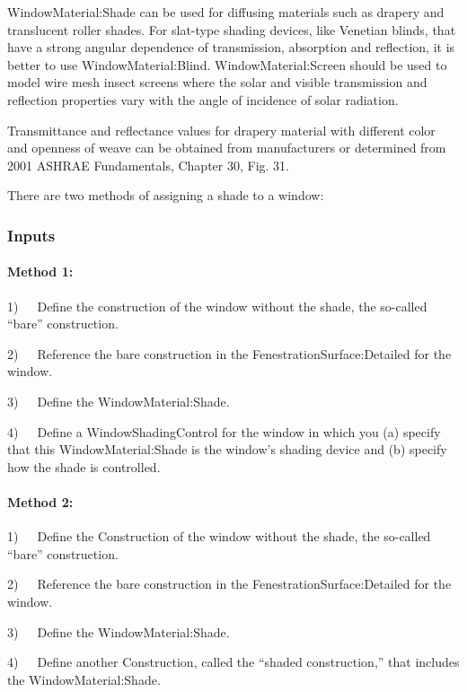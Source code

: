WindowMaterial:Shade can be used for diffusing materials such as drapery and translucent roller shades. For slat-type shading devices, like Venetian blinds, that have a strong angular dependence of transmission, absorption and reflection, it is better to use WindowMaterial:Blind. WindowMaterial:Screen should be used to model wire mesh insect screens where the solar and visible transmission and reflection properties vary with the angle of incidence of solar radiation.

Transmittance and reflectance values for drapery material with different color and openness of weave can be obtained from manufacturers or determined from 2001 ASHRAE Fundamentals, Chapter 30, Fig. 31.

There are two methods of assigning a shade to a window:

\subsubsection{Inputs}\label{inputs-22-005}

\paragraph{Method 1:}\label{method-1}

1)~~~Define the construction of the window without the shade, the so-called ``bare'' construction.

2)~~~Reference the bare construction in the FenestrationSurface:Detailed for the window.

3)~~~Define the WindowMaterial:Shade.

4)~~~Define a WindowShadingControl for the window in which you (a) specify that this WindowMaterial:Shade is the window's shading device and (b) specify how the shade is controlled.

\paragraph{Method 2:}\label{method-2}

1)~~~Define the Construction of the window without the shade, the so-called ``bare'' construction.

2)~~~Reference the bare construction in the FenestrationSurface:Detailed for the window.

3)~~~Define the WindowMaterial:Shade.

4)~~~Define another Construction, called the ``shaded construction,'' that includes the WindowMaterial:Shade.

